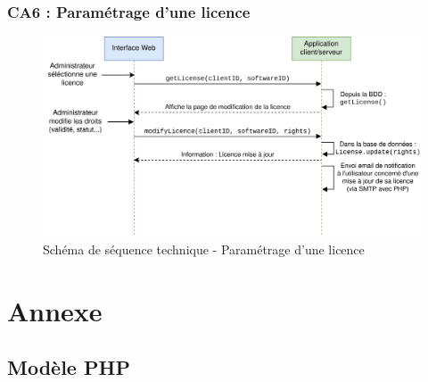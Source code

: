 \subsection{CA6 : Paramétrage d'une licence}
\begin{figure}[!h]
    \centering
    \includegraphics[width=15cm]{../png/SSD-param-licence.png}
    \caption{Schéma de séquence technique - Paramétrage d'une licence}
\end{figure}
\newpage

\chapter{Annexe}
\label{chap:Annexe}



\section{Modèle PHP}
\label{section:php}
\inputminted{php}{api.php}
